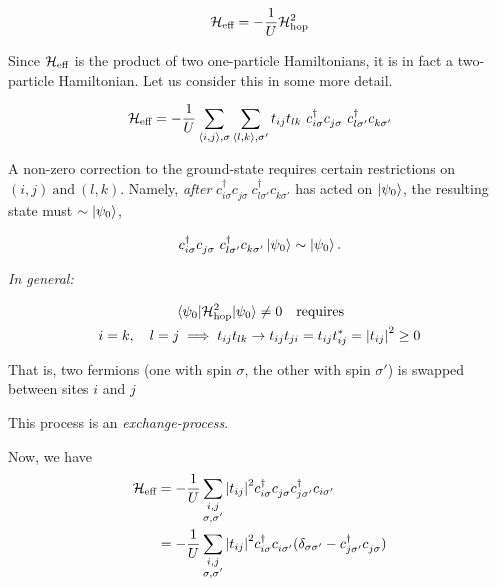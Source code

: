 \begin{equation}
	\mathcal{H}_{\text{eff}} = -\frac{1}{U} \mathcal{H}_{\text{hop}}^2
\end{equation}

Since $\mathcal{H}_{\text{eff}}$  is the product of two one-particle Hamiltonians, it is in fact a two-particle Hamiltonian. Let us consider this in some more detail.

\begin{equation}
	\mathcal{H}_{\text{eff}} = -\frac{1}{U} \sum_{\langle i, j \rangle, \sigma}  \sum_{\langle l, k \rangle , \sigma'} t_{ij} t_{lk} \ c_{i \sigma}^\dagger c_{j \sigma}^{} \ c_{l \sigma'}^\dagger c_{k \sigma'}^{}
\end{equation}

A non-zero correction to the ground-state requires certain restrictions on $(i, j) \ \text{and} \ (l,k)$. Namely, \emph{after} $c_{i \sigma}^\dagger c_{j \sigma}^{} \ c_{l \sigma'}^\dagger c_{k \sigma'}^{}$ has acted on $\ket{\psi_0}$, the resulting state must $\sim \ket{\psi_0}$,

\begin{equation}
	c_{i \sigma}^\dagger c_{j \sigma}^{} \ c_{l \sigma'}^\dagger c_{k \sigma'}^{} \ket{\psi_0} \sim \ket{\psi_0}.
\end{equation}

\emph{In general:}
\begin{center}
	
\end{center}
\begin{gather}
	\mel{\psi_0}{\mathcal{H}_{\text{hop}}^2}{\psi_0} \ne 0 \quad \text{requires} \\
	i = k, \quad l = j \implies t_{ij}t_{lk} \rightarrow t_{ij}t_{ji} = t_{ij}t_{ij}^* = \abs{t_{ij}}^2 \geq 0
\end{gather}

That is, two fermions (one with spin $\sigma$, the other with spin $\sigma'$) is swapped between sites $i$ and $j$ 

\begin{center}
	
\end{center}
This process is an \emph{exchange-process}.

Now, we have
\begin{align}
	\mathcal{H}_{\text{eff}} &= -\frac{1}{U} \sum_{\substack{i, j \\ \sigma, \sigma'}} \abs{t_{ij}}^2 c_{i \sigma}^\dagger c_{j \sigma}^{} c_{j \sigma'}^\dagger c_{i \sigma'} \\
	&= -\frac{1}{U} \sum_{\substack{i, j \\ \sigma, \sigma'}} \abs{t_{ij}}^2 c_{i \sigma}^\dagger c_{i \sigma'}^{} (\delta_{\sigma \sigma'} - c_{j \sigma'}^\dagger c_{j \sigma}^{})
\end{align}

